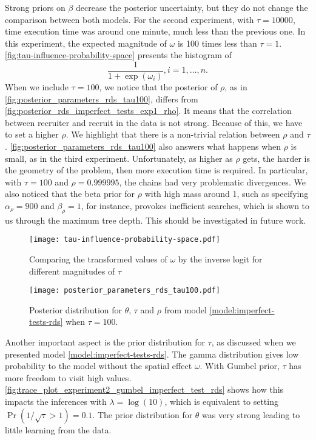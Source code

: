 Strong priors on $\beta$ decrease the posterior uncertainty, but they do not
change the comparison between both models. For the second experiment, with
$\tau = 10000$, time execution time was around one minute, much less than the
previous one. In this experiment, the expected magnitude of $\omega$ is
100 times less than $\tau = 1$. \autoref{fig:tau-influence-probability-space}
presents the histogram of 
$$
\frac{1}{1 + \exp(\omega_i)}, i = 1, \dots, n.
$$
When we include $\tau = 100$, we notice that the posterior of $\rho$, as in
\autoref{fig:posterior_parameters_rds_tau100}, differs from
\autoref{fig:posterior_rds_imperfect_tests_exp1_rho}. It means that the
correlation between recruiter and recruit in the data is not strong. Because
of this, we have to set a higher $\rho$. We highlight that there is a non-trivial
relation between $\rho$ and $\tau$.
\autoref{fig:posterior_parameters_rds_tau100} also answers what happens when
$\rho$ is small, as in the third experiment. Unfortunately, as higher as $\rho$
gets, the harder is the geometry of the problem, then more execution time is
required. In particular, with $\tau = 100$ and $\rho = 0.999995$, the chains
had very problematic divergences. We also noticed that the beta prior for
$\rho$ with high mass around 1, such as specifying $\alpha_{\rho} = 900$ and
$\beta_{\rho} = 1$, for instance, provokes inefficient searches, which is
shown to us through the maximum tree depth. This should be investigated in
future work. 

\begin{figure}[htb]
  \centering
  \caption{\label{fig:tau-influence-probability-space}Comparing
  the transformed values of $\omega$ by the inverse logit for different
  magnitudes of $\tau$}
  \texttt{[image: tau-influence-probability-space.pdf]}
\end{figure}

\begin{figure}[htb]
  \centering
  \caption{\label{fig:posterior_parameters_rds_tau100}Posterior distribution
  for $\theta$, $\tau$ and $\rho$ from model \eqref{model:imperfect-tests-rds}
  when $\tau = 100$.}
  \texttt{[image: posterior\_parameters\_rds\_tau100.pdf]}
\end{figure}

Another important aspect is the prior distribution for $\tau$, as discussed
when we presented model \eqref{model:imperfect-tests-rds}. The gamma
distribution gives low probability to the model without the spatial effect
$\omega$. With Gumbel prior, $\tau$ has more freedom to visit high values.
\autoref{fig:trace_plot_experiment2_gumbel_imperfect_test_rds} shows how this
impacts the inferences with $\lambda = \log(10)$, which is equivalent to setting
$\Pr(1/\sqrt{\tau} > 1) = 0.1$. The prior distribution for $\theta$ was very
strong leading to little learning from the data. 

